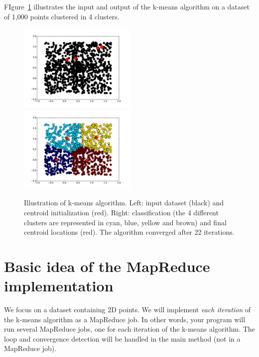 \documentclass[11pt]{article}
\begin{document}
FIgure~\ref{fig:illustration} illustrates the input and output of the
k-means algorithm on a dataset of 1,000 points clustered in 4 clusters.
\begin{figure}[h]
  \includegraphics[width=0.5\textwidth]{kmeans/initialisation.pdf}
  \includegraphics[width=0.5\textwidth]{kmeans/converged.pdf}
  \label{fig:illustration}
  \caption{Illustration of k-means algorithm. Left: input dataset
    (black) and centroid initialization (red). Right: classification
    (the 4 different clusters are represented in cyan, blue, yellow and brown) and
    final centroid locations (red). The algorithm converged after 22 iterations.}
\end{figure}

\section{Basic idea of the MapReduce implementation}

We focus on a dataset containing 2D points. We will implement
\emph{each iteration} of the k-means algorithm as a MapReduce job. In
other words, your program will run several MapReduce jobs, one for
each iteration of the k-means algorithm. The loop and convergence
detection will be handled in the main method (not in a MapReduce job). 
\end{document}
